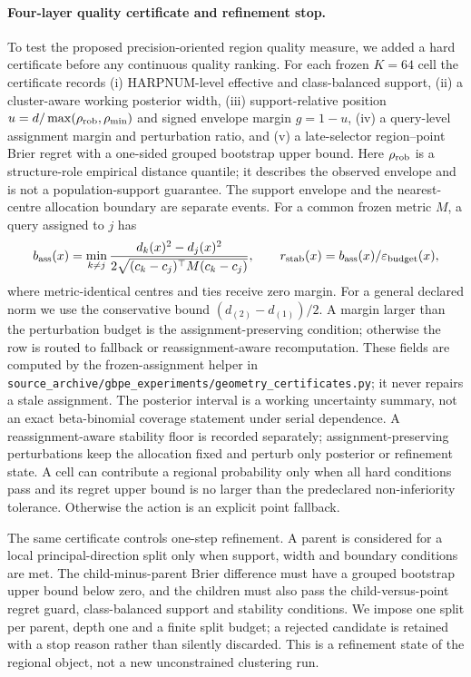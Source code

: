\documentclass[11pt,a4paper]{article}
\numberwithin{equation}{section}
\theoremstyle{definition}\newtheorem{definition}[theorem]{Definition}
\theoremstyle{remark}\newtheorem{remark}[theorem]{Remark}
\begin{document}
\paragraph{Four-layer quality certificate and refinement stop.}
To test the proposed precision-oriented region quality measure, we added a hard certificate before any continuous quality ranking. For each frozen $K=64$ cell the certificate records (i) HARPNUM-level effective and class-balanced support, (ii) a cluster-aware working posterior width, (iii) support-relative position $u=d/\max(\rho_{\rm rob},\rho_{\min})$ and signed envelope margin $g=1-u$, (iv) a query-level assignment margin and perturbation ratio, and (v) a late-selector region--point Brier regret with a one-sided grouped bootstrap upper bound. Here $\rho_{\rm rob}$ is a structure-role empirical distance quantile; it describes the observed envelope and is not a population-support guarantee. The support envelope and the nearest-centre allocation boundary are separate events. For a common frozen metric $M$, a query assigned to $j$ has
\[
b_{\rm ass}(x)=\min_{k\ne j}\frac{d_k(x)^2-d_j(x)^2}{2\sqrt{(c_k-c_j)^\top M(c_k-c_j)}},
\qquad r_{\rm stab}(x)=b_{\rm ass}(x)/\varepsilon_{\rm budget}(x),
\]
where metric-identical centres and ties receive zero margin. For a general declared norm we use the conservative bound $(d_{(2)}-d_{(1)})/2$. A margin larger than the perturbation budget is the assignment-preserving condition; otherwise the row is routed to fallback or reassignment-aware recomputation. These fields are computed by the frozen-assignment helper in \texttt{source\_archive/gbpe\_experiments/geometry\_certificates.py}; it never repairs a stale assignment. The posterior interval is a working uncertainty summary, not an exact beta-binomial coverage statement under serial dependence. A reassignment-aware stability floor is recorded separately; assignment-preserving perturbations keep the allocation fixed and perturb only posterior or refinement state. A cell can contribute a regional probability only when all hard conditions pass and its regret upper bound is no larger than the predeclared non-inferiority tolerance. Otherwise the action is an explicit point fallback.

The same certificate controls one-step refinement. A parent is considered for a local principal-direction split only when support, width and boundary conditions are met. The child-minus-parent Brier difference must have a grouped bootstrap upper bound below zero, and the children must also pass the child-versus-point regret guard, class-balanced support and stability conditions. We impose one split per parent, depth one and a finite split budget; a rejected candidate is retained with a stop reason rather than silently discarded. This is a refinement state of the regional object, not a new unconstrained clustering run.
\end{document}
